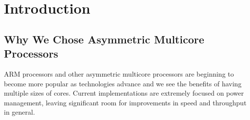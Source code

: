 \section{Introduction}
\subsection{Why We Chose Asymmetric Multicore Processors}
ARM processors and other asymmetric multicore processors are beginning to become more popular as technologies advance and we see the benefits of having multiple sizes of cores. Current implementations are extremely focused on power management, leaving significant room for improvements in speed and throughput in general.
